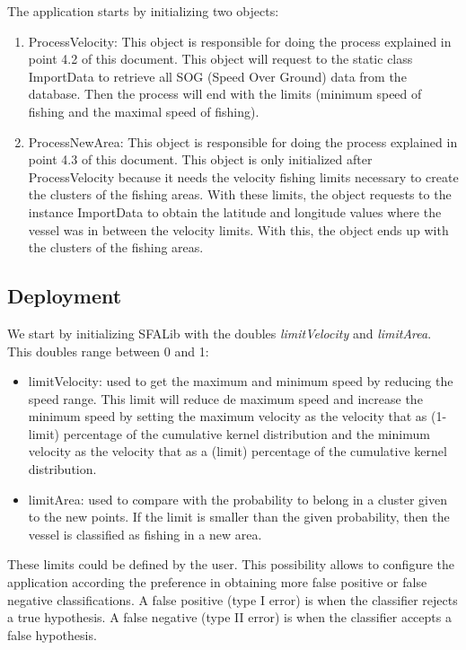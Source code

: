 The application starts by initializing two objects:
\begin{enumerate}
\item ProcessVelocity: This object is responsible for doing the process explained in point 4.2 of this document. This object will request to the static class ImportData to retrieve all SOG (Speed Over Ground) data from the database. Then the process will end with the limits (minimum speed of fishing and the maximal speed of fishing).
\item ProcessNewArea: This object is responsible for doing the process explained in point 4.3 of this document. This object is only initialized after ProcessVelocity because it needs the velocity fishing limits necessary to create the clusters of the fishing areas. With these limits, the object requests to the instance ImportData to obtain the latitude and longitude values where the vessel was in between the velocity limits. With this, the object ends up with the clusters of the fishing areas.
\end{enumerate}



\subsection{Deployment} %
\label{sub:deployment}

We start by initializing SFALib with the doubles \emph{limitVelocity} and \emph{limitArea}. This doubles range between 0 and 1:
\begin{itemize}
\item limitVelocity: used to get the maximum and minimum speed by reducing the speed range. This limit will reduce de maximum speed and increase the minimum speed by setting the maximum velocity as the velocity that as (1-limit) percentage of the cumulative kernel distribution and the minimum velocity as the velocity that as a (limit) percentage of the cumulative kernel distribution.
\item limitArea: used to compare with the probability to belong in a cluster given to the new points. If the limit is smaller than the given probability, then the vessel is classified as fishing in a new area.
\end{itemize}
These limits could be defined by the user. This possibility allows to configure the application according the preference in obtaining more false positive or false negative classifications.
A false positive (type I error) is when the classifier rejects a true hypothesis.
A false negative (type II error) is when the classifier accepts a false hypothesis.

